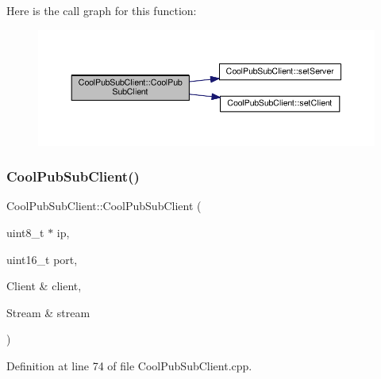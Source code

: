Here is the call graph for this function\+:\nopagebreak
\begin{figure}[H]
\begin{center}
\leavevmode
\includegraphics[width=350pt]{class_cool_pub_sub_client_a15e4dd41ebda943c377539086f70469d_cgraph}
\end{center}
\end{figure}
\mbox{\label{class_cool_pub_sub_client_a3e7d7fa4b55e36f0ac8912335993d650}} 
\subsubsection{\texorpdfstring{Cool\+Pub\+Sub\+Client()}{CoolPubSubClient()}\hspace{0.1cm}{\footnotesize\ttfamily [8/14]}}
{\footnotesize\ttfamily Cool\+Pub\+Sub\+Client\+::\+Cool\+Pub\+Sub\+Client (\begin{DoxyParamCaption}\item[{uint8\+\_\+t $\ast$}]{ip,  }\item[{uint16\+\_\+t}]{port,  }\item[{Client \&}]{client,  }\item[{Stream \&}]{stream }\end{DoxyParamCaption})}



Definition at line 74 of file Cool\+Pub\+Sub\+Client.\+cpp.

